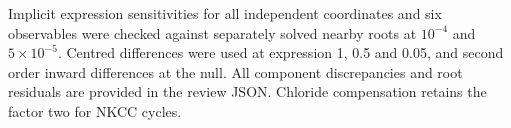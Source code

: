 Implicit expression sensitivities for all independent coordinates and six observables were checked against separately solved nearby roots at $10^{-4}$ and $5\times10^{-5}$. Centred differences were used at expression 1, 0.5 and 0.05, and second order inward differences at the null. All component discrepancies and root residuals are provided in the review JSON. Chloride compensation retains the factor two for NKCC cycles.
